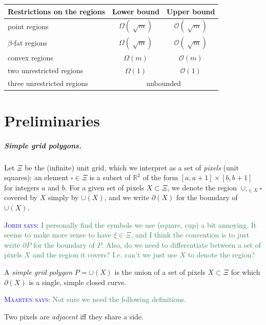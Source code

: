 \documentclass[a4paper,UKenglish,cleveref]{lipics-v2019}
\newcommand{\mremark}[3]{\textcolor{blue}{\textsc{#1 #2:}} \textcolor{SeaGreen}{\textsf{#3}}}
\newcommand{\maarten}[2][says]{\mremark{Maarten}{#1}{#2}}
\newcommand{\jordi}[2][says]{\mremark{Jordi}{#1}{#2}}
\newcommand{\bigo}{\ensuremath{\mathcal O}}
\newcommand{\pix}{\square}
\newcommand{\R}{\mathbb{R}}
\begin{document}
\begin{table}[H]
\begin{tabular}{lcc}
\toprule
Restrictions on the regions & Lower bound & Upper bound  \\ \midrule
point regions & $\Omega(\sqrt[]{m}) $ & $\bigo(\sqrt[]{m})$ \\
$\beta$-fat regions & $\Omega(\sqrt[]{m}) $ & $\bigo(\sqrt[]{m})$ \\
convex regions & $\Omega(m) $ & $\bigo(m)$ \\
two unrestricted regions &  $\Omega(1)$ & $\bigo(1)$\\
three unrestricted regions &  \multicolumn{2}{c}{unbounded}\\
\bottomrule
\end{tabular}
\end{table}


\section{Preliminaries}
\label {sec:prelims}

\subparagraph {Simple grid polygons.}

Let $\Xi$ be the (infinite) unit grid, which we interpret as a set of {\em pixels} (unit squares):
an element $\pix \in \Xi$ is a subset of $\R^2$ of the form $[a,a+1]\times[b,b+1]$ for integers $a$ and $b$.
For a given set of pixels $X \subset \Xi$, we denote the region $\cup_{\pix \in X}\pix$ covered by $X$ simply by $\cup(X)$, and we write $\partial(X)$ for the boundary of $\cup(X)$.

\jordi{I personally find the symbols we use (square, cup) a bit annoying. It seems to make more sense to have $\xi \in \Xi$, and I think the convention is to just write $\partial P$ for the boundary of $P$. Also, do we need to differentiate between a set of pixels $X$ and the region it covers? I.e. can't we just use $X$ to denote the region?}

\begin{definition}
A {\em simple grid polygon} $P = \cup(X)$ is the union of a set of pixels $X \subset \Xi$ for which $\partial(X)$ is a single, simple closed curve.
\end{definition}

\maarten {Not sure we need the following definitions.}

\begin{definition}
Two pixels are \emph{adjacent} iff they share a side.
\end{definition}
\end{document}
